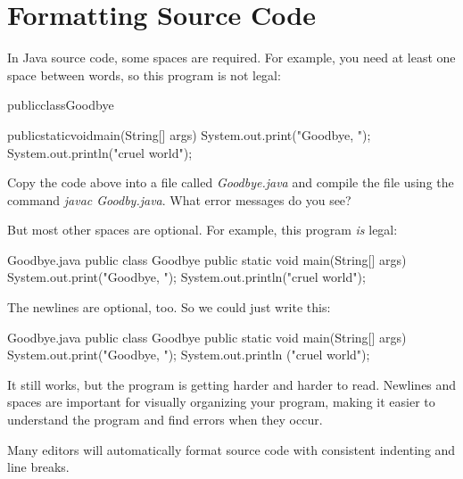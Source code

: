 \section{Formatting Source Code}
\label{formatting}

In Java source code, some spaces are required.
For example, you need at least one space between words, so this program is not legal:

\begin{code}
publicclassGoodbye{

    publicstaticvoidmain(String[] args) {
        System.out.print("Goodbye, ");
        System.out.println("cruel world");
    }
}
\end{code}

Copy the code above into a file called {\it Goodbye.java} and compile the file 
using the command {\it javac Goodby.java}. What error messages do you see?

But most other spaces are optional.
For example, this program {\em is} legal:

\begin{trinket}[220]{Goodbye.java}
public class Goodbye {
public static void main(String[] args) {
System.out.print("Goodbye, ");
System.out.println("cruel world");
}
}
\end{trinket}

The newlines are optional, too.
So we could just write this:

\begin{trinket}[175]{Goodbye.java}
public class Goodbye { public static void main(String[] args)
{ System.out.print("Goodbye, "); System.out.println
("cruel world");}}
\end{trinket}

It still works, but the program is getting harder and harder to read.
Newlines and spaces are important for visually organizing your program, making it easier to understand the program and find errors when they occur.

Many editors will automatically format source code with consistent indenting and line breaks.


%

